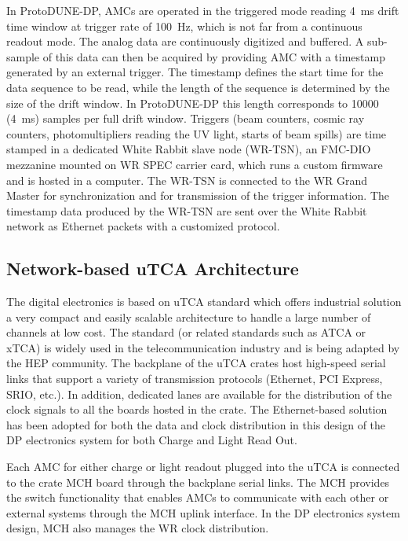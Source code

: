 In ProtoDUNE-DP, AMCs are operated in the triggered mode reading \SI{4}{\milli\second} drift time window at trigger rate of \SI{100}{Hz}, which is not far from a continuous readout mode. The analog data are continuously digitized and buffered. A sub-sample of this data can then be acquired by providing AMC with a timestamp generated by an external trigger. The timestamp defines the start time for the data sequence to be read, while the length of the sequence is determined by the size of the drift window. In ProtoDUNE-DP this length corresponds to \num{10000} (\SI{4}{\milli\second}) samples per full drift window.  Triggers (beam counters, cosmic ray counters, photomultipliers reading the UV light, starts of beam spills) are time stamped in a dedicated White Rabbit slave node (WR-TSN), an FMC-DIO mezzanine mounted on WR SPEC carrier card, which runs a custom firmware and is hosted in a computer. The WR-TSN is connected to the WR Grand Master for synchronization and for transmission of the trigger information. The timestamp data produced by the WR-TSN are sent over the White Rabbit network as Ethernet packets with a customized protocol. 
   
\subsection{Network-based uTCA Architecture}
\label{sec:fddp-tpc-elec-design-utca}

The digital electronics is based on uTCA standard which offers industrial solution a very compact and easily scalable architecture to handle a large number of channels at low cost.  The standard (or related standards such as ATCA or xTCA) is widely used in the telecommunication industry and is being adapted by the HEP community. The backplane of the uTCA crates host high-speed serial links that support a variety of transmission protocols (Ethernet, PCI Express, SRIO, etc.). In addition, dedicated lanes are available for the distribution of the clock signals to all the boards hosted in the crate.  The Ethernet-based solution has been adopted for both the data and clock distribution in this design of the DP electronics system for both Charge and Light Read Out. 

Each AMC for either charge or light readout plugged into the uTCA is connected to the crate MCH board through the backplane serial links. The MCH provides the switch functionality that enables AMCs to communicate with each other or external systems through the MCH uplink interface. In the DP electronics system design, MCH also manages the WR clock distribution. 

